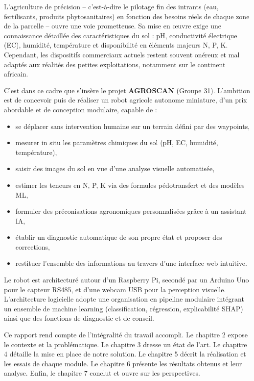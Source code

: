 \documentclass[a4paper,12pt,openany,titlepage]{scrartcl}
\begin{document}
L’agriculture de précision – c’est-à-dire le pilotage fin des intrants (eau, fertilisants, produits phytosanitaires) en fonction des besoins réels de chaque zone de la parcelle – ouvre une voie prometteuse. Sa mise en œuvre exige une connaissance détaillée des caractéristiques du sol : pH, conductivité électrique (EC), humidité, température et disponibilité en éléments majeurs N, P, K. Cependant, les dispositifs commerciaux actuels restent souvent onéreux et mal adaptés aux réalités des petites exploitations, notamment sur le continent africain.

C’est dans ce cadre que s’insère le projet \textbf{AGROSCAN} (Groupe 31). L’ambition est de concevoir puis de réaliser un robot agricole autonome miniature, d’un prix abordable et de conception modulaire, capable de :
\begin{itemize}[nosep]
    \item se déplacer sans intervention humaine sur un terrain défini par des waypoints,
    \item mesurer in situ les paramètres chimiques du sol (pH, EC, humidité, température),
    \item saisir des images du sol en vue d’une analyse visuelle automatisée,
    \item estimer les teneurs en N, P, K via des formules pédotransfert et des modèles ML,
    \item formuler des préconisations agronomiques personnalisées grâce à un assistant IA,
    \item établir un diagnostic automatique de son propre état et proposer des corrections,
    \item restituer l’ensemble des informations au travers d’une interface web intuitive.
\end{itemize}

Le robot est architecturé autour d’un Raspberry Pi, secondé par un Arduino Uno pour le capteur RS485, et d’une webcam USB pour la perception visuelle. L’architecture logicielle adopte une organisation en pipeline modulaire intégrant un ensemble de machine learning (classification, régression, explicabilité SHAP) ainsi que des fonctions de diagnostic et de conseil.

Ce rapport rend compte de l’intégralité du travail accompli. Le chapitre 2 expose le contexte et la problématique. Le chapitre 3 dresse un état de l’art. Le chapitre 4 détaille la mise en place de notre solution. Le chapitre 5 décrit la réalisation et les essais de chaque module. Le chapitre 6 présente les résultats obtenus et leur analyse. Enfin, le chapitre 7 conclut et ouvre sur les perspectives.
\end{document}
